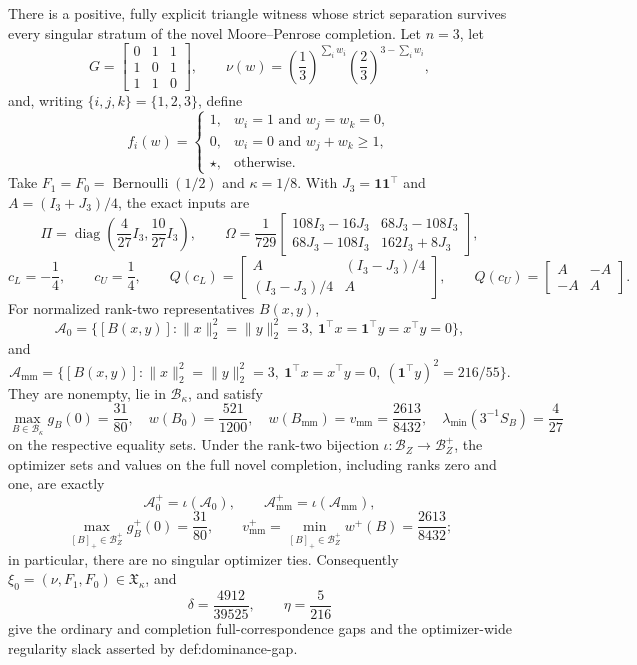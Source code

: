 There is a positive, fully explicit triangle witness whose strict separation survives every singular stratum of the novel Moore--Penrose completion.  Let \(n=3\), let
\[
G=\begin{bmatrix}0&1&1\\1&0&1\\1&1&0\end{bmatrix},
\qquad
\nu(w)=\left(\frac13\right)^{\sum_iw_i}
       \left(\frac23\right)^{3-\sum_iw_i},
\]
and, writing \(\{i,j,k\}=\{1,2,3\}\), define
\[
f_i(w)=
\begin{cases}
1,&w_i=1\text{ and }w_j=w_k=0,\\
0,&w_i=0\text{ and }w_j+w_k\ge1,\\
\star,&\text{otherwise}.
\end{cases}
\]
Take \(F_1=F_0=\operatorname{Bernoulli}(1/2)\) and \(\kappa=1/8\).  With \(J_3=\mathbf1\mathbf1^{\top}\) and \(A=(I_3+J_3)/4\), the exact inputs are
\[
\Pi=\operatorname{diag}\!\left(\frac4{27}I_3,\frac{10}{27}I_3\right),
\qquad
\Omega=\frac1{729}
\begin{bmatrix}
108I_3-16J_3&68J_3-108I_3\\
68J_3-108I_3&162I_3+8J_3
\end{bmatrix},
\]
\[
c_L=-\frac14,
\qquad c_U=\frac14,
\qquad
Q(c_L)=\begin{bmatrix}A&(I_3-J_3)/4\\(I_3-J_3)/4&A\end{bmatrix},
\qquad
Q(c_U)=\begin{bmatrix}A&-A\\-A&A\end{bmatrix}.
\]
For normalized rank-two representatives \(B(x,y)\),
\[
\mathcal A_0=\{[B(x,y)]:\lVert x\rVert_2^2=\lVert y\rVert_2^2=3,
\ \mathbf1^{\top}x=\mathbf1^{\top}y=x^{\top}y=0\},
\]
and
\[
\mathcal A_{\mathrm{mm}}=\{[B(x,y)]:\lVert x\rVert_2^2=\lVert y\rVert_2^2=3,
\ \mathbf1^{\top}x=x^{\top}y=0,
\ (\mathbf1^{\top}y)^2=216/55\}.
\]
They are nonempty, lie in \(\mathcal B_\kappa\), and satisfy
\[
\max_{B\in\mathcal B_\kappa}g_B(0)=\frac{31}{80},
\quad w(B_0)=\frac{521}{1200},
\quad w(B_{\mathrm{mm}})=v_{\mathrm{mm}}=\frac{2613}{8432},
\quad \lambda_{\min}(3^{-1}S_B)=\frac4{27}
\]
on the respective equality sets.  Under the rank-two bijection \(\iota:\mathcal B_Z\to\mathcal B_Z^+\), the optimizer sets and values on the full novel completion, including ranks zero and one, are exactly
\[
\mathcal A_0^+=\iota(\mathcal A_0),
\qquad \mathcal A_{\mathrm{mm}}^+=\iota(\mathcal A_{\mathrm{mm}}),
\]
\[
\max_{[B]_+\in\mathcal B_Z^+}g_B^+(0)=\frac{31}{80},
\qquad v_{\mathrm{mm}}^+=\min_{[B]_+\in\mathcal B_Z^+}w^+(B)=\frac{2613}{8432};
\]
in particular, there are no singular optimizer ties.  Consequently \(\xi_0=(\nu,F_1,F_0)\in\mathfrak X_\kappa\), and
\[
\delta=\frac{4912}{39525},\qquad \eta=\frac5{216}
\]
give the ordinary and completion full-correspondence gaps and the optimizer-wide regularity slack asserted by def:dominance-gap.